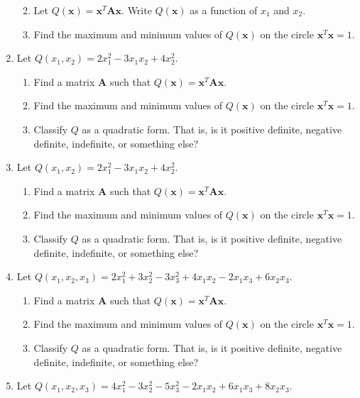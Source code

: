 \documentclass[
]{book}
\providecommand{\tightlist}{%
  \setlength{\itemsep}{0pt}\setlength{\parskip}{0pt}}
\theoremstyle{definition}
\theoremstyle{definition}
\theoremstyle{definition}
\theoremstyle{definition}
\theoremstyle{remark}
\begin{document}
\begin{enumerate}
  \begin{enumerate}
  \def\labelenumii{\alph{enumii}.}
  \tightlist
  \item
    Let \(Q(\mathbf{x})=\mathbf{x}^T\mathbf{A}\mathbf{x}.\) Write \(Q(\mathbf{x})\) as a function of \(x_1\) and \(x_2.\)
  \item
    Find the maximum and minimum values of \(Q(\mathbf{x})\) on the circle \(\mathbf{x}^T\mathbf{x}=1.\)
  \end{enumerate}
\item
  Let \(Q(x_1,x_2)=2x_1^2-3x_1x_2+4x_2^2.\)

  \begin{enumerate}
  \def\labelenumii{\alph{enumii}.}
  \tightlist
  \item
    Find a matrix \(\mathbf{A}\) such that \(Q(\mathbf{x})=\mathbf{x}^T\mathbf{A}\mathbf{x}.\)
  \item
    Find the maximum and minimum values of \(Q(\mathbf{x})\) on the circle \(\mathbf{x}^T\mathbf{x}=1.\)
  \item
    Classify \(Q\) as a quadratic form. That is, is it positive definite, negative definite, indefinite, or something else?
  \end{enumerate}
\item
  Let \(Q(x_1,x_2)=2x_1^2-3x_1x_2+4x_2^2.\)

  \begin{enumerate}
  \def\labelenumii{\alph{enumii}.}
  \tightlist
  \item
    Find a matrix \(\mathbf{A}\) such that \(Q(\mathbf{x})=\mathbf{x}^T\mathbf{A}\mathbf{x}.\)
  \item
    Find the maximum and minimum values of \(Q(\mathbf{x})\) on the circle \(\mathbf{x}^T\mathbf{x}=1.\)
  \item
    Classify \(Q\) as a quadratic form. That is, is it positive definite, negative definite, indefinite, or something else?
  \end{enumerate}
\item
  Let \(Q(x_1,x_2,x_3)=2x_1^2+3x_2^2-3x_3^2+4x_1x_2-2x_1x_3+6x_2x_3.\)

  \begin{enumerate}
  \def\labelenumii{\alph{enumii}.}
  \tightlist
  \item
    Find a matrix \(\mathbf{A}\) such that \(Q(\mathbf{x})=\mathbf{x}^T\mathbf{A}\mathbf{x}.\)
  \item
    Find the maximum and minimum values of \(Q(\mathbf{x})\) on the circle \(\mathbf{x}^T\mathbf{x}=1.\)
  \item
    Classify \(Q\) as a quadratic form. That is, is it positive definite, negative definite, indefinite, or something else?
  \end{enumerate}
\item
  Let \(Q(x_1,x_2,x_3)=4x_1^2-3x_2^2-5x_3^2-2x_1x_2+6x_1x_3+8x_2x_3.\)


\end{enumerate}
\end{document}
